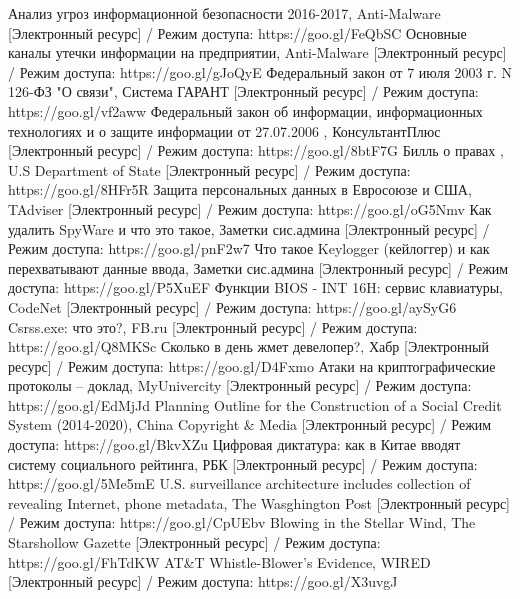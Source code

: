 
\begin{thebibliography}{}

	Анализ угроз информационной безопасности 2016-2017, Anti-Malware [Электронный ресурс] / Режим доступа:   https://goo.gl/FeQbSC
	Основные каналы утечки информации на предприятии, Anti-Malware [Электронный ресурс] / Режим доступа:   https://goo.gl/gJoQyE
	Федеральный закон от 7 июля 2003 г. N 126-ФЗ
	"О связи", Система ГАРАНТ [Электронный ресурс] / Режим доступа:   https://goo.gl/vf2aww
	Федеральный закон
	об информации, информационных  технологиях
и о защите информации от 27.07.2006
, КонсультантПлюс [Электронный ресурс] / Режим доступа: https://goo.gl/8btF7G
	Билль о правах
, U.S Department of State  [Электронный ресурс] / Режим доступа: https://goo.gl/8HFr5R
		Защита персональных данных	в Евросоюзе и США, TAdviser  [Электронный ресурс] / Режим доступа: https://goo.gl/oG5Nmv
		Как удалить SpyWare и что это такое, Заметки сис.админа  [Электронный ресурс] / Режим доступа: https://goo.gl/pnF2w7
		Что такое Keylogger (кейлоггер) и как перехватывают данные ввода, Заметки сис.админа  [Электронный ресурс] / Режим доступа: https://goo.gl/P5XuEF
		Функции BIOS - INT 16H: сервис клавиатуры, CodeNet [Электронный ресурс] / Режим доступа: https://goo.gl/aySyG6
	Csrss.exe: что это?, FB.ru [Электронный ресурс] / Режим доступа: https://goo.gl/Q8MKSc
	Сколько в день жмет девелопер?, Хабр [Электронный ресурс] / Режим  доступа: https://goo.gl/D4Fxmo
	Атаки на криптографические протоколы -- доклад, MyUnivercity [Электронный ресурс] / Режим   доступа: https://goo.gl/EdMjJd
	Planning Outline for the Construction of a Social Credit System (2014-2020), China Copyright \& Media [Электронный ресурс] / Режим доступа: https://goo.gl/BkvXZu
	Цифровая диктатура: как в Китае вводят систему социального рейтинга, РБК [Электронный ресурс] / Режим доступа: https://goo.gl/5Me5mE
	U.S. surveillance architecture includes collection of revealing Internet, phone metadata, The Wasghington Post [Электронный ресурс] / Режим доступа: https://goo.gl/CpUEbv
	 Blowing in the Stellar Wind, The Starshollow Gazette [Электронный ресурс] / Режим доступа: https://goo.gl/FhTdKW
	 AT\&T Whistle-Blower's Evidence, WIRED [Электронный ресурс] / Режим доступа: https://goo.gl/X3uvgJ

\end{thebibliography}

